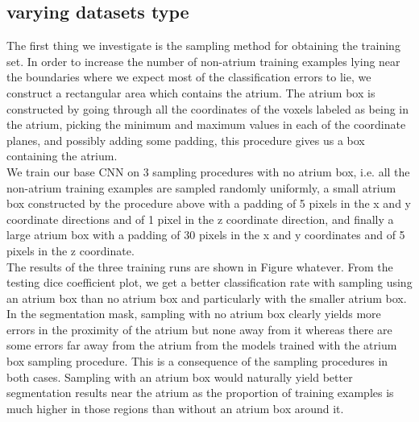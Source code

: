 \subsection{varying datasets type}

\noindent The first thing we investigate is the sampling method for obtaining the training set. In order to increase the number of non-atrium training examples lying near the boundaries where we expect most of the classification errors to lie, we construct a rectangular area which contains the atrium. The atrium box is constructed by going through all the coordinates of the voxels labeled as being in the atrium, picking the minimum and maximum values in each of the coordinate planes, and possibly adding some padding, this procedure gives us a box containing the atrium. \\

\noindent We train our base CNN on 3 sampling procedures with no atrium box, i.e. all the non-atrium training examples are sampled randomly uniformly, a small atrium box constructed by the procedure above with a padding of 5 pixels in the x and y coordinate directions and of 1 pixel in the z coordinate direction, and finally a large atrium box with a padding of 30 pixels in the x and y coordinates and of 5 pixels in the z coordinate.\\

\noindent The results of the three training runs are shown in Figure whatever. From the testing dice coefficient plot, we get a better classification rate with sampling using an atrium box than no atrium box and particularly with the smaller atrium box. In the segmentation mask, sampling with no atrium box clearly yields more errors in the proximity of the atrium but none away from it whereas there are some errors far away from the atrium from the models trained with the atrium box sampling procedure. This is a consequence of the sampling procedures in both cases. Sampling with an atrium box would naturally yield better segmentation results near the atrium as the proportion of training examples is much higher in those regions than without an atrium box around it.\\

